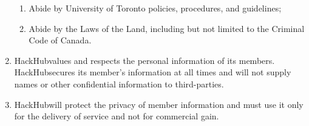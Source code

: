 \documentclass[12pt]{article}
\newcommand{\orgname}{HackHub\space}
\begin{document}
\begin{enumerate}[{3}.1]
\begin{enumerate}[{3.4}.1]
        \item	Abide by University of Toronto policies, procedures, and guidelines;
        \item	Abide by the Laws of the Land, including but not limited to the Criminal Code of Canada. 
    \end{enumerate}
    \item \orgname values and respects the personal information of its members. \orgname secures its member’s information at all times and will not supply names or other confidential information to third-parties. 
    \item \orgname will protect the privacy of member information and must use it only for the delivery of service and not for commercial gain.
\end{enumerate}


\end{document}
